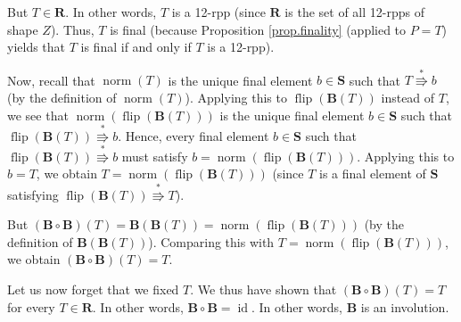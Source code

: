 \documentclass[numbers=enddot,12pt,final,onecolumn,notitlepage]{scrartcl}%
\theoremstyle{definition}
\begin{document}
But $T\in\mathbf{R}$. In other words, $T$ is a 12-rpp (since $\mathbf{R}$ is
the set of all 12-rpps of shape $Z$). Thus, $T$ is final (because Proposition
\ref{prop.finality} (applied to $P=T$) yields that $T$ is final if and only if
$T$ is a 12-rpp).

Now, recall that $\operatorname*{norm}\left(  T\right)  $ is the unique final
element $b\in\mathbf{S}$ such that $T\overset{\ast}{\Rrightarrow}b$ (by the
definition of $\operatorname*{norm}\left(  T\right)  $). Applying this to
$\operatorname*{flip}\left(  \mathbf{B}\left(  T\right)  \right)  $ instead of
$T$, we see that $\operatorname*{norm}\left(  \operatorname*{flip}\left(
\mathbf{B}\left(  T\right)  \right)  \right)  $ is the unique final element
$b\in\mathbf{S}$ such that $\operatorname*{flip}\left(  \mathbf{B}\left(
T\right)  \right)  \overset{\ast}{\Rrightarrow}b$. Hence, every final element
$b\in\mathbf{S}$ such that $\operatorname*{flip}\left(  \mathbf{B}\left(
T\right)  \right)  \overset{\ast}{\Rrightarrow}b$ must satisfy
$b=\operatorname*{norm}\left(  \operatorname*{flip}\left(  \mathbf{B}\left(
T\right)  \right)  \right)  $. Applying this to $b=T$, we obtain
$T=\operatorname*{norm}\left(  \operatorname*{flip}\left(  \mathbf{B}\left(
T\right)  \right)  \right)  $ (since $T$ is a final element of $\mathbf{S}$
satisfying $\operatorname*{flip}\left(  \mathbf{B}\left(  T\right)  \right)
\overset{\ast}{\Rrightarrow}T$).

But $\left(  \mathbf{B}\circ\mathbf{B}\right)  \left(  T\right)
=\mathbf{B}\left(  \mathbf{B}\left(  T\right)  \right)  =\operatorname*{norm}%
\left(  \operatorname*{flip}\left(  \mathbf{B}\left(  T\right)  \right)
\right)  $ (by the definition of $\mathbf{B}\left(  \mathbf{B}\left(
T\right)  \right)  $). Comparing this with $T=\operatorname*{norm}\left(
\operatorname*{flip}\left(  \mathbf{B}\left(  T\right)  \right)  \right)  $,
we obtain $\left(  \mathbf{B}\circ\mathbf{B}\right)  \left(  T\right)  =T$.

Let us now forget that we fixed $T$. We thus have shown that $\left(
\mathbf{B}\circ\mathbf{B}\right)  \left(  T\right)  =T$ for every
$T\in\mathbf{R}$. In other words, $\mathbf{B}\circ\mathbf{B}%
=\operatorname*{id}$. In other words, $\mathbf{B}$ is an involution.
\end{document}
